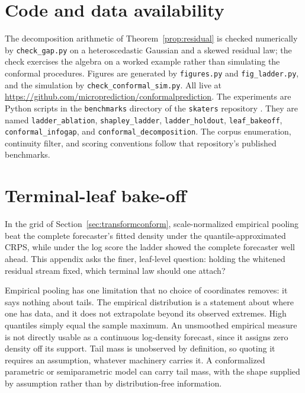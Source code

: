 \documentclass[11pt]{article}
\theoremstyle{remark}
\newif\ifanon
\begin{document}
\section*{Code and data availability}
\ifanon
Code and data references are withheld for double-blind review and will be restored on
acceptance. The experiments are Python scripts against a public online-forecasting library;
script names match the labels used in the text.
\else
\begin{sloppypar}
 The decomposition arithmetic of Theorem~\ref{prop:residual} is checked numerically by
\texttt{check\_gap.py} on a heteroscedastic Gaussian and a skewed residual law; the check
exercises the algebra on a worked example rather than simulating the conformal procedures. Figures are generated by \texttt{figures.py} and \texttt{fig\_ladder.py}, and the
simulation by \texttt{check\_conformal\_sim.py}. All live at
\url{https://github.com/microprediction/conformalprediction}. The experiments are Python scripts in the \texttt{benchmarks} directory of the
\texttt{skaters} repository \citep{cotton_skaters}. They are named \texttt{ladder\_ablation}, \texttt{shapley\_ladder},
\texttt{ladder\_holdout}, \texttt{leaf\_bakeoff}, \texttt{conformal\_infogap}, and
\texttt{conformal\_decomposition}. The corpus enumeration, continuity filter, and scoring conventions
follow that repository's published benchmarks.
\end{sloppypar}
\fi

\appendix

\section{Terminal-leaf bake-off}\label{app:bakeoff}

In the grid of Section~\ref{sec:transformconform}, scale-normalized empirical pooling beat
the complete forecaster's fitted density under the quantile-approximated CRPS, while under
the log score the ladder showed the complete forecaster well ahead. This appendix asks the finer,
leaf-level question: holding the whitened residual stream fixed, which terminal law should
one attach?

Empirical pooling has one limitation that no choice of coordinates removes: it says nothing
about tails. The empirical distribution is a statement about where one has data, and it does
not extrapolate beyond its observed extremes. High quantiles simply equal the sample maximum. An
unsmoothed empirical measure is not directly usable as a continuous log-density forecast,
since it assigns zero density off its support. Tail mass is unobserved by definition, so
quoting it requires an assumption, whatever machinery carries it. A conformalized parametric
or semiparametric model can carry tail mass, with the shape supplied by assumption rather
than by distribution-free information.
\end{document}
